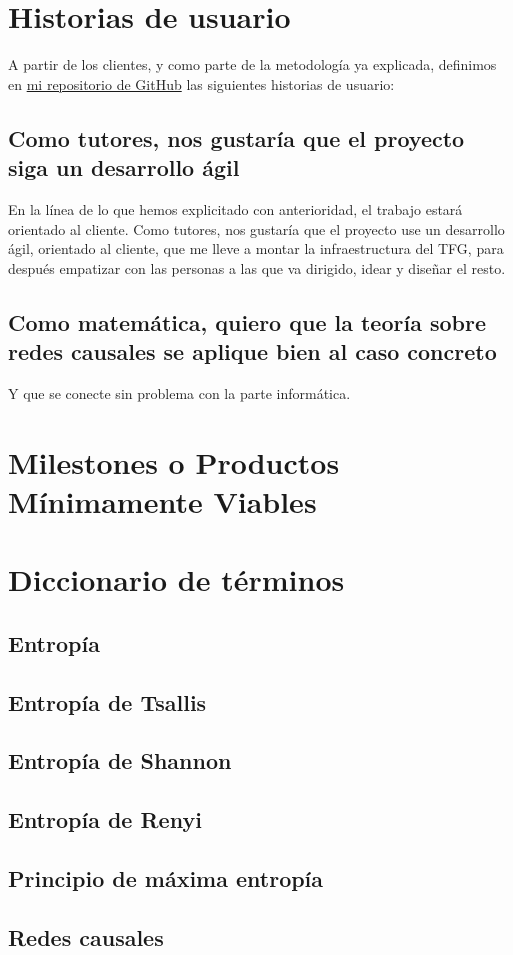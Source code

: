 \section{Historias de usuario}  

A partir de los clientes, y como parte de la metodología ya explicada, definimos en \href{https://github.com/ElenaMerelo/TFG}{mi repositorio 
de GitHub} las siguientes historias de usuario: 

\subsection{Como tutores, nos gustaría que el proyecto siga un desarrollo ágil}

En la línea de lo que hemos explicitado con anterioridad, el trabajo estará orientado 
al cliente.
Como tutores, nos gustaría que el proyecto use un desarrollo ágil, orientado al cliente, 
que me lleve a montar la infraestructura del TFG, para después empatizar con las personas 
a las que va dirigido, idear y diseñar el resto.

\subsection*{Como matemática, quiero que la teoría sobre redes causales se aplique bien al caso concreto}

Y que se conecte sin problema con la parte informática.

\section{Milestones o Productos Mínimamente Viables}


\section{Diccionario de términos}

\subsection{Entropía}

\subsection{Entropía de Tsallis}

\subsection{Entropía de Shannon}

\subsection{Entropía de Renyi} 


\subsection{Principio de máxima entropía}

\subsection{Redes causales}